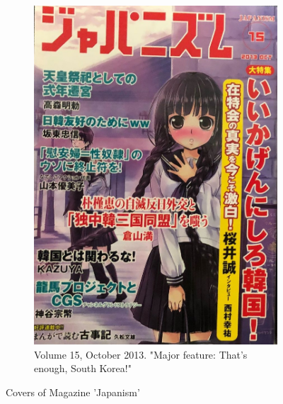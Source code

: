\documentclass[10pt,british,A4paper,twoside]{memoir}
\begin{document}
\begin{figure}[!htb]
 \begin{subfigure}[b]{0.30\textwidth}
 \includegraphics[width=\textwidth]{images/japanism4.jpg}
 \caption{Volume 15, October 2013. "Major feature: That’s enough, South Korea!"}
 \label{fig:japanism4}
 \end{subfigure}
 \caption{Covers of Magazine 'Japanism'}\label{fig:twitter}
\end{figure}
\end{document}
